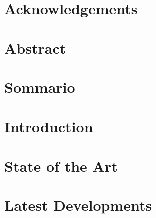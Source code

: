 \documentclass[12pt,a4paper,twoside,openright]{memoir}
\theoremstyle{definition}
\begin{document}
\nonzeroparskip
\frontmatter

\cleardoublepage

\pagestyle{plain}
\chapter*{Acknowledgements}

\cleardoublepage
{}
\tableofcontents
\cleardoublepage
{}
\listoffigures
{}
\listoftables
\chapter{Abstract}

\chapter{Sommario}

\mainmatter
\pagestyle {ruled}
\chapter{Introduction}
\label{chap:intro}

\chapter{State of the Art}
\label{chap:sota}

\chapter{Latest Developments}
\label{chap:latdel}

\end{document}
